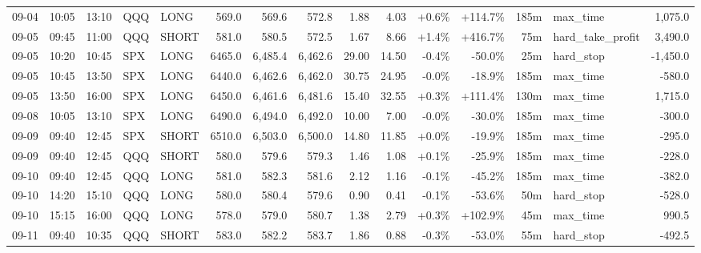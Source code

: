 \documentclass[11pt,a4paper,twoside]{article}
\begin{document}
\begin{landscape}
\begin{center}
\begin{longtable}{>{\color{txtmain}}l l l l l r r r r r r r r >{\color{txtmain}}l r}
09-04 & 10:05 & 13:10 & QQQ & LONG & 569.0 & 569.6 & 572.8 & 1.88 & 4.03 & \textcolor{wingreen}{+0.6\%} & \textcolor{wingreen}{+114.7\%} & 185m & max\_time & \textcolor{wingreen}{1,075.0} \\
09-05 & 09:45 & 11:00 & QQQ & SHORT & 581.0 & 580.5 & 572.5 & 1.67 & 8.66 & \textcolor{wingreen}{+1.4\%} & \textcolor{wingreen}{+416.7\%} & 75m & hard\_take\_profit & \textcolor{wingreen}{3,490.0} \\
09-05 & 10:20 & 10:45 & SPX & LONG & 6465.0 & 6,485.4 & 6,462.6 & 29.00 & 14.50 & \textcolor{lossred}{-0.4\%} & \textcolor{lossred}{-50.0\%} & 25m & hard\_stop & \textcolor{lossred}{-1,450.0} \\
09-05 & 10:45 & 13:50 & SPX & LONG & 6440.0 & 6,462.6 & 6,462.0 & 30.75 & 24.95 & \textcolor{lossred}{-0.0\%} & \textcolor{lossred}{-18.9\%} & 185m & max\_time & \textcolor{lossred}{-580.0} \\
09-05 & 13:50 & 16:00 & SPX & LONG & 6450.0 & 6,461.6 & 6,481.6 & 15.40 & 32.55 & \textcolor{wingreen}{+0.3\%} & \textcolor{wingreen}{+111.4\%} & 130m & max\_time & \textcolor{wingreen}{1,715.0} \\
09-08 & 10:05 & 13:10 & SPX & LONG & 6490.0 & 6,494.0 & 6,492.0 & 10.00 & 7.00 & \textcolor{lossred}{-0.0\%} & \textcolor{lossred}{-30.0\%} & 185m & max\_time & \textcolor{lossred}{-300.0} \\
09-09 & 09:40 & 12:45 & SPX & SHORT & 6510.0 & 6,503.0 & 6,500.0 & 14.80 & 11.85 & \textcolor{wingreen}{+0.0\%} & \textcolor{lossred}{-19.9\%} & 185m & max\_time & \textcolor{lossred}{-295.0} \\
09-09 & 09:40 & 12:45 & QQQ & SHORT & 580.0 & 579.6 & 579.3 & 1.46 & 1.08 & \textcolor{wingreen}{+0.1\%} & \textcolor{lossred}{-25.9\%} & 185m & max\_time & \textcolor{lossred}{-228.0} \\
09-10 & 09:40 & 12:45 & QQQ & LONG & 581.0 & 582.3 & 581.6 & 2.12 & 1.16 & \textcolor{lossred}{-0.1\%} & \textcolor{lossred}{-45.2\%} & 185m & max\_time & \textcolor{lossred}{-382.0} \\
09-10 & 14:20 & 15:10 & QQQ & LONG & 580.0 & 580.4 & 579.6 & 0.90 & 0.41 & \textcolor{lossred}{-0.1\%} & \textcolor{lossred}{-53.6\%} & 50m & hard\_stop & \textcolor{lossred}{-528.0} \\
09-10 & 15:15 & 16:00 & QQQ & LONG & 578.0 & 579.0 & 580.7 & 1.38 & 2.79 & \textcolor{wingreen}{+0.3\%} & \textcolor{wingreen}{+102.9\%} & 45m & max\_time & \textcolor{wingreen}{990.5} \\
09-11 & 09:40 & 10:35 & QQQ & SHORT & 583.0 & 582.2 & 583.7 & 1.86 & 0.88 & \textcolor{lossred}{-0.3\%} & \textcolor{lossred}{-53.0\%} & 55m & hard\_stop & \textcolor{lossred}{-492.5} \\

\end{longtable}
\end{center}
\end{landscape}
\end{document}
